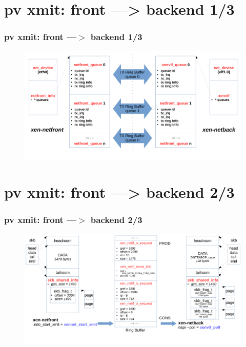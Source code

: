 \documentclass[aspectratio=169]{beamer}
\begin{document}
\section{pv xmit: front ---> backend 1/3}
\begin{frame}
\frametitle{pv xmit: front ---$>$ backend 1/3}
\begin{figure}
\includegraphics[width=1.0\linewidth]{figures/eth_to_vif.pdf}
\end{figure}
\end{frame}


\section{pv xmit: front ---> backend 2/3}
\begin{frame}
\frametitle{pv xmit: front ---$>$ backend 2/3}
\begin{figure}
\includegraphics[width=1.0\linewidth]{figures/xmit_skb.pdf}
\end{figure}
\end{frame}

\end{document}

